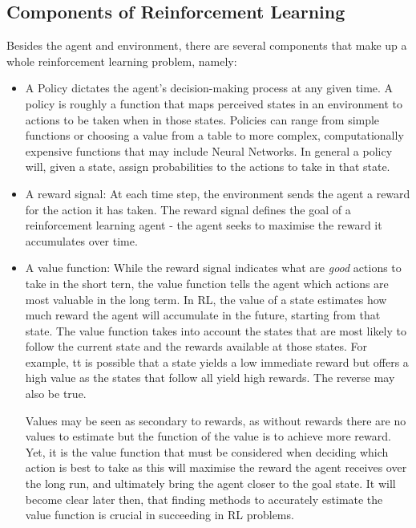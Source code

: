 \documentclass{article}
\begin{document}
\subsection{Components of Reinforcement Learning}

Besides the agent and environment, there are several components that make up a whole reinforcement learning problem\cite{Sutton1998}, namely: 

\begin{itemize}
    \item A Policy dictates the agent's decision-making process at any given time. A policy is roughly a function that maps perceived states in an environment to actions to be taken when in those states. Policies can range from simple functions or choosing a value from a table to more complex, computationally expensive functions that may include Neural Networks. In general a policy will, given a state, assign probabilities to the actions to take in that state. 
    
    \item A reward signal: At each time step, the environment sends the agent a reward for the action it has taken. The reward signal defines the goal of a reinforcement learning agent - the agent seeks to maximise the reward it accumulates over time.
    
    \item A value function: While the reward signal indicates what are \textit{good} actions to take in the short tern, the value function tells the agent which actions are most valuable in the long term. In RL, the value of a state estimates how much reward the agent will accumulate in the future, starting from that state. The value function takes into account the states that are most likely to follow the current state and the rewards available at those states. For example, tt is possible that a state yields a low immediate reward but offers a high value as the states that follow all yield high rewards. The reverse may also be true.
    
    Values may be seen as secondary to rewards, as without rewards there are no values to estimate but the function of the value is to achieve more reward. Yet, it is the value function that must be considered when deciding which action is best to take as this will maximise the reward the agent receives over the long run, and ultimately bring the agent closer to the goal state. It will become clear later then, that finding methods to accurately estimate the value function is crucial in succeeding in RL problems.
    

\end{itemize}
\end{document}
